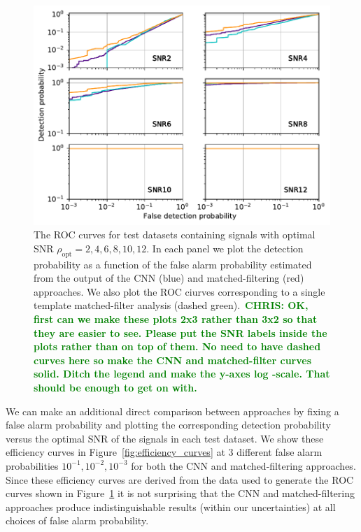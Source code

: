 \documentclass[%
 amsmath,amssymb,
 aps,
 twocolumn,
 prl,
 reprint,
floatfix,
]{revtex4-1}
\newcommand{\chris}[1]{\textbf{\textcolor{green}{CHRIS: #1}}}
\begin{document}
%
%
\begin{figure}[]
\includegraphics[width=\columnwidth] {figures/ROC_curves.pdf}
\caption{The \ac{ROC} curves for test datasets containing signals with optimal
SNR $\rho_{\mathrm{opt}}=2,4,6,8,10,12$.  In each panel we plot the detection
probability as a function of the false alarm probability estimated from the
output of the \ac{CNN} (blue) and matched-filtering (red) approaches. We also
plot the \ac{ROC} ciurves corresponding to a single template matched-filter
analysis (dashed green).~\chris{OK, first can we make these plots 2x3 rather
than 3x2 so that they are easier to see. Please put the SNR labels inside the
plots rather than on top of them. No need to have dashed curves here so make
the CNN and matched-filter curves solid. Ditch the legend and make the y-axes
log -scale. That should be enough to get on with.\label{fig:ROC_curves}}}
\end{figure}

%
%
We can make an additional direct comparison between approaches by fixing a
false alarm probability and plotting the corresponding detection probability
versus the optimal SNR of the signals in each test dataset. We show these
efficiency curves in Figure~\ref{fig:efficiency_curves} at 3 different false alarm
probabilities $10^{-1},10^{-2},10^{-3}$ for both the \ac{CNN} and
matched-filtering approaches. Since these efficiency curves are derived from
the data used to generate the \ac{ROC} curves shown in
Figure~\ref{fig:ROC_curves} it is not surprising that the \ac{CNN} and
matched-filtering approaches produce indistinguishable results (within our
uncertainties) at all choices of false alarm probability.
\end{document}
